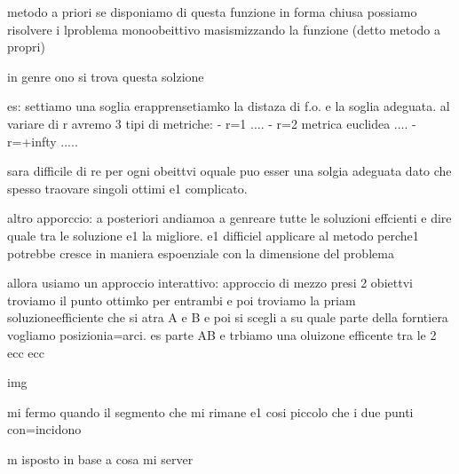 metodo a priori
se disponiamo di questa funzione in forma chiusa possiamo risolvere i lproblema monoobeittivo masismizzando la funzione (detto metodo a propri)

in genre ono si trova questa solzione

es: settiamo una soglia erapprensetiamko la distaza di f.o. e la soglia adeguata. al variare di r avremo  3 tipi di metriche:
- r=1 ....
- r=2 metrica euclidea ....
- r=+infty .....

sara difficile di re per ogni obeittvi oquale puo esser una solgia adeguata dato che spesso traovare singoli ottimi e1 complicato.




altro apporccio: a posteriori
andiamoa a genreare tutte le soluzioni effcienti e dire quale tra le soluzione e1 la migliore. e1 difficiel applicare al metodo perche1 potrebbe cresce in maniera espoenziale con la dimensione del problema



allora usiamo un approccio interattivo:
approccio di mezzo
presi 2 obiettvi troviamo il punto ottimko per entrambi e poi troviamo la priam soluzioneefficiente che si atra A e B e poi si scegli a su quale parte della forntiera vogliamo posizionia=arci. es parte AB e trbiamo una oluizone efficente tra le 2 ecc ecc
 
img

mi fermo quando il segmento che mi rimane e1 cosi piccolo che i due punti con=incidono

m isposto in base a cosa mi server